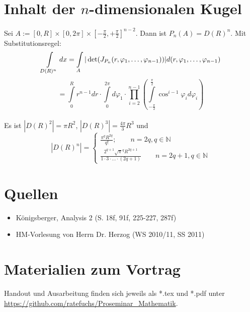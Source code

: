 \documentclass[a4paper,11pt]{scrartcl}
\newcommand{\N}{{\ensuremath{\mathbb{N}}}}
\begin{document}
\section{Inhalt der $n$-dimensionalen Kugel}
Sei $A:=[0,R]\times[0,2\pi]\times[-\frac{\pi}{2},+\frac{\pi}{2}]^{n-2}$. Dann ist $P_n(A)=D(R)^n$.
Mit Substitutionsregel:$$\int\limits_{D(R)^n}dx=\int\limits_A |\det(J_{P_n}(r,\varphi_1,\ldots,\varphi_{n-1}))|d(r,\varphi_1,\ldots,\varphi_{n-1})\\$$
$$= \int\limits_0^R r^{n-1}dr \cdot\int\limits_0^{2\pi}d\varphi_1 \cdot\prod\limits_{i=2}^{n-1}\left(\int\limits_{-\frac{\pi}{2}}^\frac{\pi}{2}\cos^{i-1}\varphi_i d\varphi_i\right)$$\\ Es ist $|D(R)^2|=\pi R^2$, $|D(R)^3|=\frac{4\pi}{3} R^3$ und
$$|D(R)^n|=\begin{cases}\frac{\pi^q R^{2q}}{q!}; \qquad n=2q, q\in\N \\ \frac{2^{q+1}\sqrt{\pi}^q R^{2q+1}}{1\cdot 3\cdot \ldots\cdot (2q+1)} \qquad n=2q+1, q\in\N\end{cases} $$
\section{Quellen}
\begin{itemize}
\item Königsberger, Analysis 2 (S. 18f, 91f, 225-227, 287f)
\item HM-Vorlesung von Herrn Dr. Herzog (WS 2010/11, SS 2011)
\end{itemize}
\section{Materialien zum Vortrag}
Handout und Ausarbeitung finden sich jeweils als *.tex und *.pdf unter\\ \underline{https://github.com/ratefuchs/Proseminar\_Mathematik}.
\end{document}
